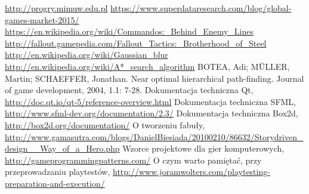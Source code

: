 \documentclass[licencjacka]{pracamgr}
\begin{document}
\begin{thebibliography}{99}
   \url{http://progry.mimuw.edu.pl}
   \url{https://www.superdataresearch.com/blog/global-games-market-2015/}
   \url{https://en.wikipedia.org/wiki/Commandos:_Behind_Enemy_Lines}
   \url{http://fallout.gamepedia.com/Fallout_Tactics:_Brotherhood_of_Steel}
   \url{http://en.wikipedia.org/wiki/Gaussian_blur}
   \url{http://en.wikipedia.org/wiki/A*_search_algorithm}
   BOTEA, Adi; MÜLLER, Martin; SCHAEFFER, Jonathan. Near optimal hierarchical path-finding. Journal of game
  development, 2004, 1.1: 7-28.
   Dokumentacja techniczna Qt, \url{http://doc.qt.io/qt-5/reference-overview.html}
   Dokumentacja techniczna SFML, \url{http://www.sfml-dev.org/documentation/2.3/}
   Dokumentacja techniczna Box2d, \url{http://box2d.org/documentation/}
   O tworzeniu fabuły, \url{http://www.gamasutra.com/blogs/DanielBiesiada/20100210/86632/Storydriven_design__Way_of_a_Hero.php}
   Wzorce projektowe dla gier komputerowych, \url{http://gameprogrammingpatterns.com/}
   O czym warto pamiętać, przy przeprowadzaniu playtestów, \url{http://www.joramwolters.com/playtesting-preparation-and-execution/}
    
\end{thebibliography}
\end{document}
